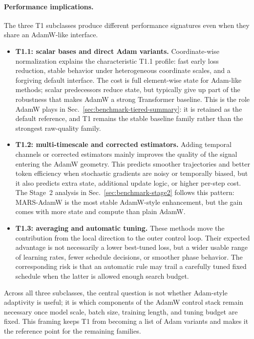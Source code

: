 \paragraph{Performance implications.}
The three T1 subclasses produce different performance signatures even when
they share an AdamW-like interface.
\begin{itemize}[leftmargin=*,itemsep=2pt]
  \item \textbf{T1.1: scalar bases and direct Adam variants.}
  Coordinate-wise normalization explains the characteristic T1.1 profile:
  fast early loss reduction, stable behavior under heterogeneous coordinate
  scales, and a forgiving default interface.  The cost is full element-wise
  state for Adam-like methods; scalar predecessors reduce state, but typically
  give up part of the robustness that makes AdamW a strong Transformer
  baseline.  This is the role AdamW plays in
  Sec.~\ref{sec:benchmark-tiered-summary}: it is retained as the default
  reference, and T1 remains the stable baseline family rather than the
  strongest raw-quality family.
  \item \textbf{T1.2: multi-timescale and corrected estimators.}
  Adding temporal channels or corrected estimators mainly improves the quality
  of the signal entering the AdamW geometry.  This predicts smoother
  trajectories and better token efficiency when stochastic gradients are noisy
  or temporally biased, but it also predicts extra state, additional update
  logic, or higher per-step cost.  The Stage~2 analysis in
  Sec.~\ref{sec:benchmark-stage2} follows this pattern: MARS-AdamW is the
  most stable AdamW-style enhancement, but the gain comes with more state and
  compute than plain AdamW.
  \item \textbf{T1.3: averaging and automatic tuning.}
  These methods move the contribution from the local direction to the outer
  control loop.  Their expected advantage is not necessarily a lower
  best-tuned loss, but a wider usable range of learning rates, fewer schedule
  decisions, or smoother phase behavior.  The corresponding risk is that an
  automatic rule may trail a carefully tuned fixed schedule when the latter is
  allowed enough search budget.
\end{itemize}

Across all three subclasses, the central question is not whether Adam-style
adaptivity is useful; it is which components of the AdamW control stack remain
necessary once model scale, batch size, training length, and tuning budget are
fixed.  This framing keeps T1 from becoming a list of Adam variants and makes
it the reference point for the remaining families.